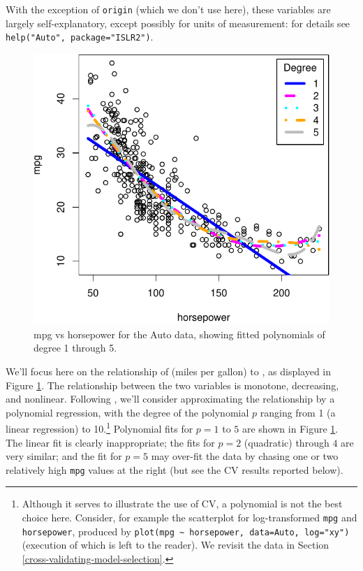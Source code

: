\documentclass[
]{jss}
\begin{document}
With the exception of \texttt{origin} (which we don't use here), these
variables are largely self-explanatory, except possibly for units of
measurement: for details see \texttt{help("Auto",\ package="ISLR2")}.

\begin{CodeChunk}
\begin{figure}

{\centering \includegraphics[width=0.5\linewidth]{JSS-article-reduced-2_files/figure-latex/mpg-horsepower-scatterplot-polynomials-1} 

}

\caption[mpg vs horsepower for the Auto data, showing fitted polynomials of degree 1 through 5]{mpg vs horsepower for the Auto data, showing fitted polynomials of degree 1 through 5.}\label{fig:mpg-horsepower-scatterplot-polynomials}
\end{figure}
\end{CodeChunk}

We'll focus here on the relationship of  (miles per gallon) to
, as displayed in Figure
\ref{fig:mpg-horsepower-scatterplot-polynomials}. The relationship
between the two variables is monotone, decreasing, and nonlinear.
Following \citet{JamesEtAl:2021}, we'll consider approximating the
relationship by a polynomial regression, with the degree of the
polynomial \(p\) ranging from 1 (a linear regression) to 10.\footnote{Although
  it serves to illustrate the use of CV, a polynomial is not the best
  choice here. Consider, for example the scatterplot for log-transformed
  \texttt{mpg} and \texttt{horsepower}, produced by
  \texttt{plot(mpg\ \textasciitilde{}\ horsepower,\ data=Auto,\ log="xy")}
  (execution of which is left to the reader). We revisit the 
  data in Section \ref{cross-validating-model-selection}.} Polynomial
fits for \(p = 1\) to \(5\) are shown in Figure
\ref{fig:mpg-horsepower-scatterplot-polynomials}. The linear fit is
clearly inappropriate; the fits for \(p = 2\) (quadratic) through \(4\)
are very similar; and the fit for \(p = 5\) may over-fit the data by
chasing one or two relatively high \texttt{mpg} values at the right (but
see the CV results reported below).
\end{document}
